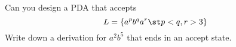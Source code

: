 Can you design a PDA that accepts
\[
L = \{ a^p b^q a^r \st p < q, r > 3 \}
\]
Write down a derivation for $a^2 b^5$ that ends in an accept state.
